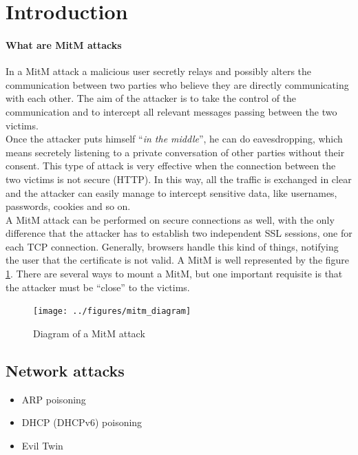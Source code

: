 \documentclass[final]{article}
\begin{document}
\def\snode#1#2#3{%
  \node[long,right=of #1, label=center:#3] (#2) {}}

\def\dnode#1#2#3{%
  \node[double,right=of #1, label=center:#3] (#2) {}}



\section{Introduction}
\paragraph{What are \ac{MitM} attacks}
In a \ac{MitM} attack a malicious user secretly relays
and possibly alters the communication between two parties who believe they
are directly communicating with each other. The aim of the attacker is to
take the control of the communication and to intercept all relevant messages
passing between the two victims. \\
Once the attacker puts himself ``\textit{in the middle}'', he can do eavesdropping,
which means secretely listening to a private conversation of other parties without their consent.
This type of attack is very effective when the connection between the two
victims is not secure (HTTP).
In this way, all the traffic is exchanged in clear and the attacker can
easily manage to intercept sensitive data, like usernames, passwords, cookies and so on. \\
A \ac{MitM} attack can be performed on secure connections as well,
with the only difference that the attacker has to establish
two independent SSL sessions, one for each TCP connection.
Generally, browsers handle this kind of things,
notifying the user that the certificate is not valid.
A \ac{MitM} is well represented by the figure \ref{mitm}.
There are several ways to mount a \ac{MitM},
but one important requisite is that the attacker must be ``close''
to the victims.
\begin{figure}
\center
\texttt{[image: ../figures/mitm\_diagram]}
\caption{Diagram of a \ac{MitM} attack}
\label{mitm}
\end{figure}


\subsection{Network attacks}

\begin{itemize}
  \item ARP poisoning
  \item DHCP (DHCPv6) poisoning
  \item Evil Twin
\end{itemize}
\end{document}
